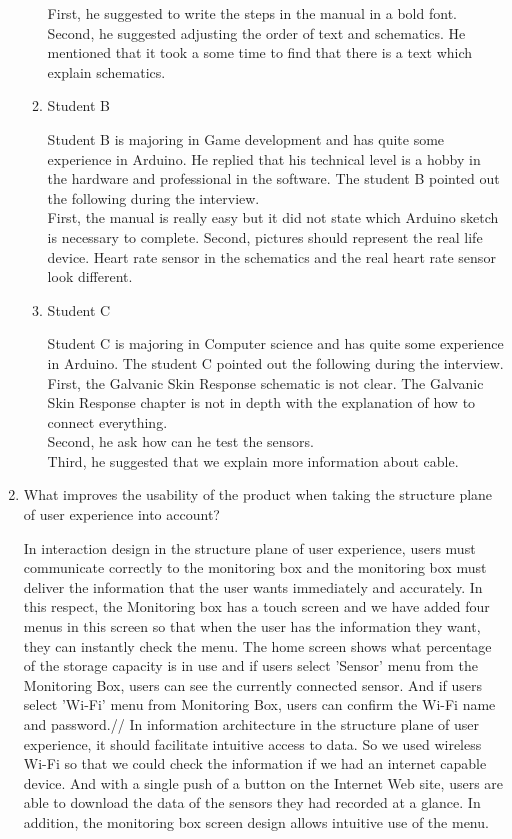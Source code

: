 \documentclass[conference]{IEEEtran}
\begin{document}
\begin{enumerate}
\begin{enumerate}
		First, he suggested to write the steps in the manual in a bold font.\\
		Second, he suggested adjusting the order of text and schematics. He mentioned that it took a some time to find that there is a text which explain schematics. 

\item Student B

Student B is majoring in Game development and has  quite some experience in Arduino. He replied that his technical level is a hobby in the hardware and professional in the software. The student B pointed out the following during the interview.\\

		First, the manual is really easy but it did not state which Arduino sketch is necessary to complete.
		Second, pictures should represent the real life device. Heart rate sensor in the schematics and the real heart rate sensor look different.

\item Student C

Student C is majoring in Computer science and has  quite some experience in Arduino. The student C pointed out the following during the interview.\\

		First, the Galvanic Skin Response schematic is not clear. The Galvanic Skin Response chapter is not in depth with the explanation of how to connect everything.\\
		Second, he ask how can he test the sensors.\\
		Third, he suggested that we explain more information about cable.\\

\end{enumerate}

 
\item What improves the usability of the product when taking the structure plane of user experience into account?

In interaction design in the structure plane of user experience, users must communicate correctly to the monitoring box and the monitoring box must deliver the information that the user wants immediately and accurately. In this respect, the Monitoring box has a touch screen and we have added four menus in this screen so that when the user has the information they want, they can instantly check the menu. The home screen shows what percentage of the storage capacity is in use and if users select 'Sensor' menu from the Monitoring Box, users can see the currently connected sensor. And if users select 'Wi-Fi' menu from Monitoring Box, users can confirm the Wi-Fi name and password.//
In information architecture in the structure plane of user experience, it should facilitate intuitive access to data. So we used wireless Wi-Fi so that we could check the information if we had an internet capable device. And with a single push of a button on the Internet Web site, users are able to download the data of the sensors they had recorded at a glance. In addition, the monitoring box screen design allows intuitive use of the menu.
\\


\end{enumerate}
\end{document}
